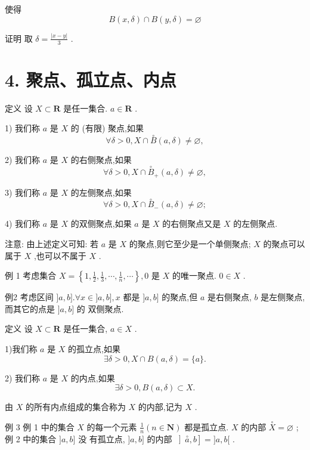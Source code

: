 使得
$$B\left( {x,\delta }\right)  \cap  B\left( {y,\delta }\right)  = \varnothing$$

证明 取 $\delta  = \frac{\left| x - y\right| }{3}$ .

\section*{4. 聚点、孤立点、内点}

定义 设 $X \subset  \mathbf{R}$ 是任一集合. $a \in  \mathbf{R}$ .

1) 我们称 $a$ 是 $X$ 的 (有限) 聚点,如果
$$\forall \delta  > 0,X \cap  \overset{ \circ  }{B}\left( {a,\delta }\right)  \neq  \varnothing ,$$

2) 我们称 $a$ 是 $X$ 的右侧聚点,如果
$$\forall \delta  > 0,X \cap  {\overset{ \circ  }{B}}_{ + }\left( {a,\delta }\right)  \neq  \varnothing ,$$

3) 我们称 $a$ 是 $X$ 的左侧聚点,如果
$$\forall \delta  > 0,X \cap  {\overset{ \circ  }{B}}_{ - }\left( {a,\delta }\right)  \neq  \varnothing ;$$

4) 我们称 $a$ 是 $X$ 的双侧聚点,如果 $a$ 是 $X$ 的右侧聚点又是 $X$ 的左侧聚点.

注意: 由上述定义可知: 若 $a$ 是 $X$ 的聚点,则它至少是一个单侧聚点; $X$ 的聚点可以属于 $X$ ,也可以不属于 $X$ .

例 1 考虑集合 $X = \left\{  {1,\frac{1}{2},\frac{1}{3},\cdots ,\frac{1}{n},\cdots }\right\}  ,0$ 是 $X$ 的唯一聚点. $0 \in  X$ .

例2 考虑区间 $\rbrack a,b\rbrack .\forall x \in  \rbrack a,b\rbrack ,x$ 都是 $\rbrack a,b\rbrack$ 的聚点,但 $a$ 是右侧聚点, $b$ 是左侧聚点,而其它的点是 $\rbrack a,b\rbrack$ 的 双侧聚点.

定义 设 $X \subset  \mathbf{R}$ 是任一集合, $a \in  X$ .

1)我们称 $a$ 是 $X$ 的孤立点,如果
$$\exists \delta  > 0,X \cap  B\left( {a,\delta }\right)  = \{ a\} .$$

2) 我们称 $a$ 是 $X$ 的内点,如果
$$\exists \delta  > 0,B\left( {a,\delta }\right)  \subset  X.$$

由 $X$ 的所有内点组成的集合称为 $X$ 的内部,记为 $X$ .

例 3 例 1 中的集合 $X$ 的每一个元素 $\frac{1}{n}\left( {n \in  \mathbf{N}}\right)$ 都是孤立点. $X$ 的内部 $\overset{ \circ  }{X} = \varnothing$ ; 例 2 中的集合 $\rbrack a,b\rbrack$ 没 有孤立点, $\rbrack a,b\rbrack$ 的内部 $\left\rbrack  {\overset{ \circ  }{a},b}\right\rbrack   = \rbrack a,b\lbrack$ .

